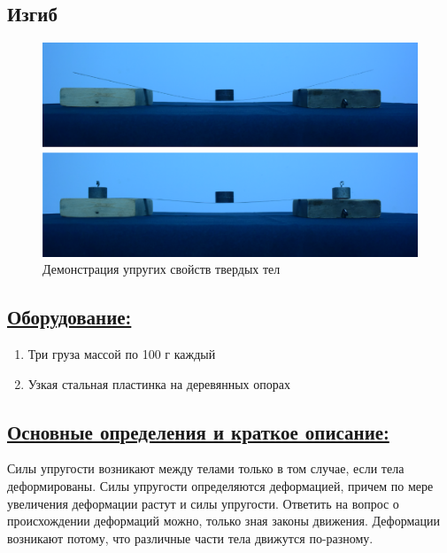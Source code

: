 \documentclass[14pt,a4paper,oneside]{extarticle}	%
\begin{document}

\begin{center}
	\subsection*{Изгиб}
\end{center}

\begin{figure}[H] 
	\centering 
	\includegraphics[width=0.9\linewidth]{bend-1.png}
	\caption{Демонстрация упругих свойств твердых тел}
	\label{bend-1}
\end{figure}

\subsection*{\underline{Оборудование:}}

\begin{enumerate}
	\item Три груза массой по 100 г каждый
	\item Узкая стальная пластинка на деревянных опорах
\end{enumerate}

\subsection*{\underline{Основные определения и краткое описание:}}

Силы упругости возникают между телами только в том случае, если тела деформированы.
Силы упругости определяются деформацией, причем по мере увеличения деформации растут и силы упругости.
Ответить на вопрос о происхождении деформаций можно, только зная законы движения.
Деформации возникают потому, что различные части тела движутся по-разному.
\end{document}
